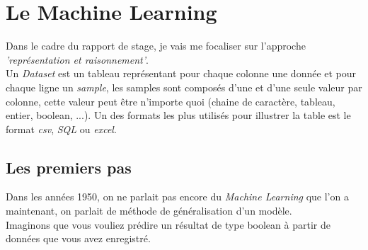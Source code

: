 \chapter{Le Machine Learning}

Dans le cadre du rapport de stage, je vais me focaliser sur l'approche \textit{'représentation et raisonnement'}.\\
\linebreak
Un \textit{Dataset} est un tableau représentant pour chaque colonne une donnée et pour chaque ligne un \textit{sample}, les samples sont composés d'une et d'une seule valeur par colonne, cette valeur peut être n'importe quoi (chaine de caractère, tableau, entier, boolean, ...). Un des formats les plus utilisés pour illustrer la table est le format \textit{csv}, \textit{SQL} ou \textit{excel}.\\
\pagebreak

\section{Les premiers pas}

Dans les années 1950, on ne parlait pas encore du \textit{Machine Learning} que l'on a maintenant, on parlait de méthode de généralisation d'un modèle.\\
Imaginons que vous vouliez prédire un résultat de type boolean à partir de données que vous avez enregistré.

